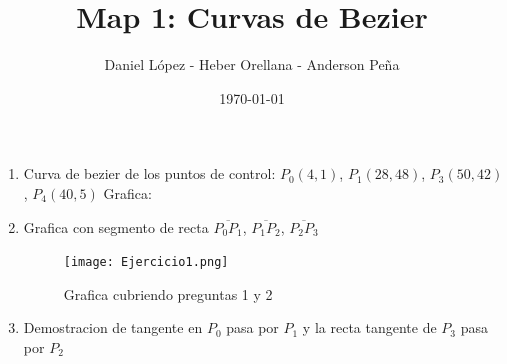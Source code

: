 \documentclass[11pt]{article}
\begin{document}
\author{Daniel López - Heber Orellana - Anderson Peña} \date{\today}
\title{Map 1: Curvas de Bezier}
\maketitle

\medskip

\begin{enumerate}

\item
Curva de bezier de los puntos de control: $P_0(4,1)$, $P_1(28,48)$, $P_3(50,42)$, $P_4(40,5)$
Grafica:

\item
Grafica con segmento de recta $\overline{P_0 P_1}$, $\overline{P_1 P_2}$, $\overline{P_2 P_3}$

\begin{center}
	\begin{figure}[h!]
		\centering
		\texttt{[image: Ejercicio1.png]}
		\caption{Grafica cubriendo preguntas 1 y 2}
	\end{figure}
\end{center}

\item
Demostracion de tangente en $P_0$ pasa por $P_1$ y la recta tangente de  $P_3$ pasa por $P_2$



\end{enumerate}
\end{document}
